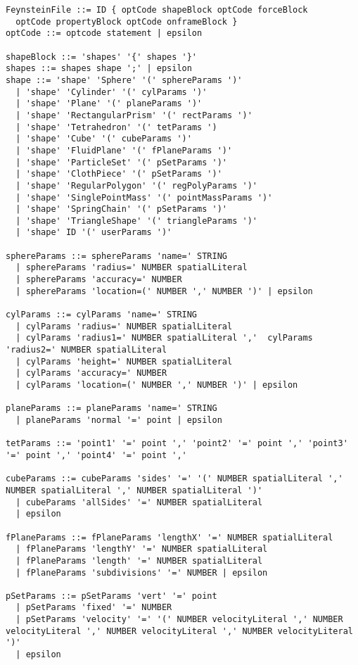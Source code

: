 \documentclass[letterpaper]{article}
\begin{document}
\begin{verbatim}
FeynsteinFile ::= ID { optCode shapeBlock optCode forceBlock 
  optCode propertyBlock optCode onframeBlock }
optCode ::= optcode statement | epsilon

shapeBlock ::= 'shapes' '{' shapes '}'
shapes ::= shapes shape ';' | epsilon
shape ::= 'shape' 'Sphere' '(' sphereParams ')' 
  | 'shape' 'Cylinder' '(' cylParams ')' 
  | 'shape' 'Plane' '(' planeParams ')' 
  | 'shape' 'RectangularPrism' '(' rectParams ')' 
  | 'shape' 'Tetrahedron' '(' tetParams ') 
  | 'shape' 'Cube' '(' cubeParams ')'
  | 'shape' 'FluidPlane' '(' fPlaneParams ')'
  | 'shape' 'ParticleSet' '(' pSetParams ')'
  | 'shape' 'ClothPiece' '(' pSetParams ')'
  | 'shape' 'RegularPolygon' '(' regPolyParams ')'
  | 'shape' 'SinglePointMass' '(' pointMassParams ')'
  | 'shape' 'SpringChain' '(' pSetParams ')'
  | 'shape' 'TriangleShape' '(' triangleParams ')'
  | 'shape' ID '(' userParams ')' 

sphereParams ::= sphereParams 'name=' STRING 
  | sphereParams 'radius=' NUMBER spatialLiteral 
  | sphereParams 'accuracy=' NUMBER
  | sphereParams 'location=(' NUMBER ',' NUMBER ')' | epsilon

cylParams ::= cylParams 'name=' STRING 
  | cylParams 'radius=' NUMBER spatialLiteral 
  | cylParams 'radius1=' NUMBER spatialLiteral ','  cylParams 'radius2=' NUMBER spatialLiteral 
  | cylParams 'height=' NUMBER spatialLiteral 
  | cylParams 'accuracy=' NUMBER
  | cylParams 'location=(' NUMBER ',' NUMBER ')' | epsilon

planeParams ::= planeParams 'name=' STRING 
  | planeParams 'normal '=' point | epsilon

tetParams ::= 'point1' '=' point ',' 'point2' '=' point ',' 'point3' '=' point ',' 'point4' '=' point ','

cubeParams ::= cubeParams 'sides' '=' '(' NUMBER spatialLiteral ',' NUMBER spatialLiteral ',' NUMBER spatialLiteral ')'
  | cubeParams 'allSides' '=' NUMBER spatialLiteral
  | epsilon 

fPlaneParams ::= fPlaneParams 'lengthX' '=' NUMBER spatialLiteral
  | fPlaneParams 'lengthY' '=' NUMBER spatialLiteral
  | fPlaneParams 'length' '=' NUMBER spatialLiteral
  | fPlaneParams 'subdivisions' '=' NUMBER | epsilon

pSetParams ::= pSetParams 'vert' '=' point 
  | pSetParams 'fixed' '=' NUMBER 
  | pSetParams 'velocity' '=' '(' NUMBER velocityLiteral ',' NUMBER velocityLiteral ',' NUMBER velocityLiteral ',' NUMBER velocityLiteral ')'
  | epsilon


\end{verbatim}
\end{document}
